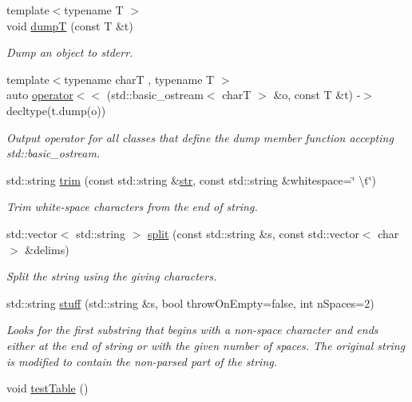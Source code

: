 \begin{DoxyCompactItemize}
{\footnotesize template$<$typename T $>$ }\\void \hyperlink{namespaceslb_1_1core_1_1util_a06aba127ff89c79f893cf9e1cb10ff79}{dumpT} (const T \&t)
\begin{DoxyCompactList}\small\item\em Dump an object to {\ttfamily stderr}. \end{DoxyCompactList}\item 
{\footnotesize template$<$typename charT , typename T $>$ }\\auto \hyperlink{namespaceslb_1_1core_1_1util_a719c889c611ba3d22441ad3d29243e1a}{operator$<$$<$} (std\+::basic\+\_\+ostream$<$ charT $>$ \&o, const T \&t) -\/$>$ decltype(t.\+dump(o))
\begin{DoxyCompactList}\small\item\em Output operator for all classes that define the dump member function accepting {\ttfamily std\+::basic\+\_\+ostream}. \end{DoxyCompactList}\item 
std\+::string \hyperlink{namespaceslb_1_1core_1_1util_a47a5d48f761811dede67fba654950c34}{trim} (const std\+::string \&\hyperlink{namespaceslb_1_1core_1_1util_a2e7207fe123391c539ef9924d347f7e1}{str}, const std\+::string \&whitespace=\char`\"{} \textbackslash{}t\char`\"{})
\begin{DoxyCompactList}\small\item\em Trim white-\/space characters from the end of string. \end{DoxyCompactList}\item 
std\+::vector$<$ std\+::string $>$ \hyperlink{namespaceslb_1_1core_1_1util_a0b17f4ccc4a084619d95187d7dad6f65}{split} (const std\+::string \&s, const std\+::vector$<$ char $>$ \&delims)
\begin{DoxyCompactList}\small\item\em Split the string using the giving characters. \end{DoxyCompactList}\item 
std\+::string \hyperlink{namespaceslb_1_1core_1_1util_ad3241e5d4d570f8547a7ce25cf830ed9}{stuff} (std\+::string \&s, bool throw\+On\+Empty=false, int n\+Spaces=2)
\begin{DoxyCompactList}\small\item\em Looks for the first substring that begins with a non-\/space character and ends either at the end of string or with the given number of spaces. The original string is modified to contain the non-\/parsed part of the string. \end{DoxyCompactList}\item 
void \hyperlink{namespaceslb_1_1core_1_1util_a4a58db5cca1c87149055968926cd0cd6}{test\+Table} ()\hypertarget{namespaceslb_1_1core_1_1util_a4a58db5cca1c87149055968926cd0cd6}{}\label{namespaceslb_1_1core_1_1util_a4a58db5cca1c87149055968926cd0cd6}


\end{DoxyCompactItemize}
